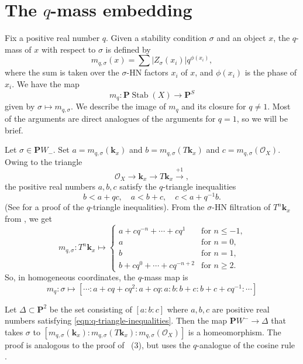 \documentclass{amsart}
\begin{document}
\section{The \(q\)-mass embedding}\label{sec:qmass}
Fix a positive real number \(q\).
Given a stability condition \(\sigma\) and an object \(x\), the \(q\)-mass of \(x\) with respect to \(\sigma\) is defined by
\[ m_{q, \sigma}(x) = \sum |Z_{\sigma}(x_i)| q^{\phi(x_i)},\]
where the sum is taken over the \(\sigma\)-HN factors \(x_i\) of \(x\), and \(\phi(x_i)\) is the phase of \(x_i\).
We have the map
\[ m_q \colon \mathbf{P} \operatorname{Stab}(X) \to \mathbf{P}^S\]
given by \(\sigma \mapsto m_{q,\sigma}\).
We describe the image of \(m_q\) and its closure for \(q \neq 1\).
Most of the arguments are direct analogues of the arguments for \(q = 1\), so we will be brief.

Let \(\sigma \in \mathbf{P}W_-\).
Set \(a = m_{q,\sigma}(\mathbf{k}_x)\) and \(b = m_{q,\sigma}(T\mathbf{k}_x)\) and \(c = m_{q,\sigma}(\mathcal{O}_X)\).
Owing to the triangle 
\[ \mathcal{O}_X \to \mathbf{k}_x \to T\mathbf{k}_x \xrightarrow{+1},\]
the positive real numbers \(a,b,c\) satisfy the \(q\)-triangle inequalities 
\begin{equation}\label{eqn:q-triangle-inequalities}
  b < a + qc, \quad a < b + c, \quad c < a + q^{-1}b.
\end{equation}
(See \cite[Proposition~3.3]{ike:21} for a proof of the \(q\)-triangle inequalities).
From the \(\sigma\)-HN filtration of \(T^n\mathbf{k}_x\) from , we get
\[ m_{q, \sigma} \colon T^n \mathbf{k}_x \mapsto
  \begin{cases}
    a + cq^{-n}+ \cdots + c q^{1} &\text{for \(n \leq -1\),}\\
    a &\text{for \(n = 0\),}\\
    b & \text{for \(n = 1\),}\\
    b + c q^0 + \cdots + c q^{-n+2} & \text{for \(n \geq 2\)}.
  \end{cases}
\]
So, in homogeneous coordinates, the \(q\)-mass map is
\[ m_q \colon \sigma \mapsto [ \cdots :a + cq+cq^2 : a + cq :a: b: b + c : b + c + c q^{-1} : \cdots ]\]

Let \(\Delta \subset \mathbf{P}^2\) be the set consisting of \([a:b:c]\) where \(a,b,c\) are positive real numbers satisfying \eqref{eqn:q-triangle-inequalities}.
Then the map \( \mathbf{P} W^- \to \Delta\)
that takes \(\sigma\) to \([m_{q,\sigma}(\mathbf{k}_x):m_{q,\sigma}(T\mathbf{k}_x): m_{q,\sigma}(\mathcal{O}_X)]\)
is a homeomorphism.
The proof is analogous to the proof of ~(3), but uses the \(q\)-analogue of the cosine rule \cite[Lemma~5.2]{bap.bec.lic:22}.
\end{document}
